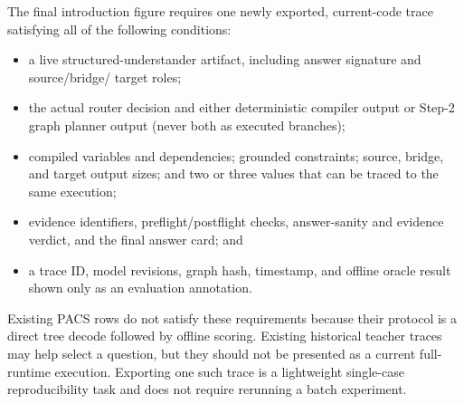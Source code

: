 The final introduction figure requires one newly exported, current-code trace satisfying all of
the following conditions:
\begin{itemize}
  \item a live structured-understander artifact, including answer signature and source/bridge/
  target roles;
  \item the actual router decision and either deterministic compiler output or Step-2 graph
  planner output (never both as executed branches);
  \item compiled variables and dependencies; grounded constraints; source, bridge, and target
  output sizes; and two or three values that can be traced to the same execution;
  \item evidence identifiers, preflight/postflight checks, answer-sanity and evidence verdict,
  and the final answer card; and
  \item a trace ID, model revisions, graph hash, timestamp, and offline oracle result shown only
  as an evaluation annotation.
\end{itemize}
Existing PACS rows do not satisfy these requirements because their protocol is a direct tree
decode followed by offline scoring.  Existing historical teacher traces may help select a
question, but they should not be presented as a current full-runtime execution.  Exporting one
such trace is a lightweight single-case reproducibility task and does not require rerunning a
batch experiment.
